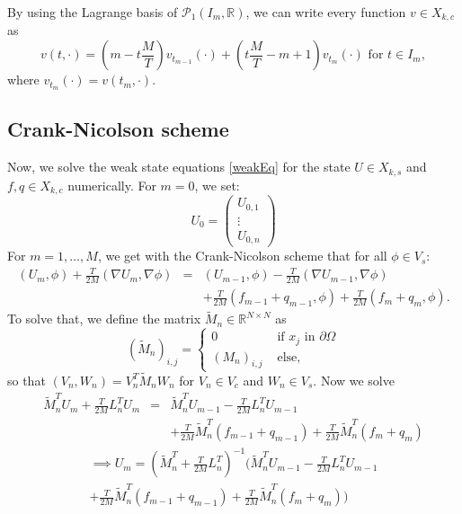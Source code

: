 By using the Lagrange basis of $\mathcal{P}_1(I_m,\mathbb{R})$, we can write every function $v\in X_{k,c}$ as
\begin{displaymath}
v(t,\cdot)=\left(m-t\frac{M}{T}\right) v_{t_{m-1}}(\cdot)+\left(t\frac{M}{T}-m+1\right) v_{t_m}(\cdot)\text{ for }t\in I_m,
\end{displaymath}
where $v_{t_m}(\cdot)=v(t_m,\cdot)$.


\subsection{Crank-Nicolson scheme}
Now, we solve the weak state equations \eqref{weakEq} for the state $U\in X_{k,s}$ and $f,q\in X_{k,c}$ numerically. For $m=0$, we set:
\begin{displaymath}
U_0=\begin{pmatrix} U_{0,1} \\ \vdots \\ U_{0,n} \end{pmatrix}
\end{displaymath}
For $m=1,\dotsc,M$, we get with the Crank-Nicolson scheme that for all $\phi\in V_s$:
\begin{eqnarray*}
(U_m,\phi) + \frac{T}{2M}(\nabla U_m, \nabla \phi) & = &(U_{m-1},\phi) - \frac{T}{2M}(\nabla U_{m-1}, \nabla \phi)\\
&& + \frac{T}{2M}(f_{m-1} + q_{m-1}, \phi) + \frac{T}{2M}(f_m + q_m, \phi).
\end{eqnarray*}
To solve that, we define the matrix $\tilde{M}_n\in\mathbb{R}^{N\times N}$ as
\begin{displaymath}
\left(\tilde{M}_n\right)_{i,j}=\begin{cases}
0 & \text{ if $x_j$ in $\partial\Omega$}\\
\left(M_n\right)_{i,j} & \text{ else,}
\end{cases}
\end{displaymath}
so that $(V_n,W_n)=V_n^T\tilde{M}_nW_n$ for $V_n\in V_c$ and $W_n\in V_s$. Now we solve
\begin{eqnarray*}
\tilde{M}_n^TU_m + \frac{T}{2M} L_n^T U_m &=& \tilde{M}_n^TU_{m-1} - \frac{T}{2M} L_n^T U_{m-1}\\
&& + \frac{T}{2M} \tilde{M}_n^T (f_{m-1} + q_{m-1}) + \frac{T}{2M} \tilde{M}_n^T (f_m + q_m)
\end{eqnarray*}
\begin{multline}
\label{crank_nicolson}
\implies U_m = \left(\tilde{M}_n^T + \frac{T}{2M} L_n^T\right)^{-1} \bigg( \tilde{M}_n^TU_{m-1} - \frac{T}{2M} L_n^T U_{m-1}\\
 + \frac{T}{2M} \tilde{M}_n^T (f_{m-1} + q_{m-1}) + \frac{T}{2M} \tilde{M}_n^T (f_m + q_m)\bigg)
\end{multline}

